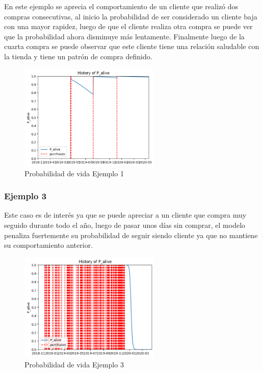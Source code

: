 En este ejemplo se aprecia el comportamiento de un cliente que realizó dos compras consecutivas, al inicio la probabilidad de ser considerado un cliente baja con una mayor rapidez, luego de que el cliente realiza otra compra se puede ver que la probabilidad ahora disminuye más lentamente. Finalmente luego de la cuarta compra se puede observar que este cliente tiene una relación saludable con la tienda y tiene un patrón de compra definido.

\begin{figure}[H]
	\centering \includegraphics[width=0.60\textwidth]{images/e1.png}
	\caption{Probabilidad de vida Ejemplo 1}
	\label{fig:e1}
\end{figure}

\subsubsection{Ejemplo 3}

Este caso es de interés ya que se puede apreciar a un cliente que compra muy seguido durante todo el año, luego de pasar unos días sin comprar, el modelo penaliza fuertemente su probabilidad de seguir siendo cliente ya que no mantiene su comportamiento anterior.

\begin{figure}[H]
	\centering \includegraphics[width=0.60\textwidth]{images/e3.png}
	\caption{Probabilidad de vida Ejemplo 3}
	\label{fig:e3}
\end{figure}

